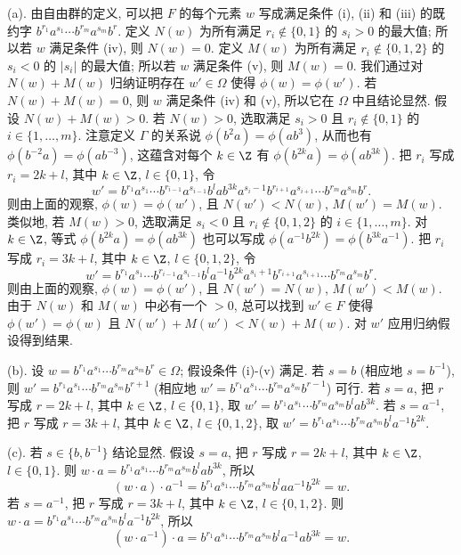 \begin{solution}
(a). 由自由群的定义, 可以把 $F$ 的每个元素 $w$ 写成满足条件 (i), (ii) 和 (iii) 的既约字 $b^{r_1}a^{s_1}\cdots b^{r_m}a^{s_m}b^r$. 定义 $N(w)$ 为所有满足 $r_i \notin \{0, 1\}$ 的 $s_i > 0$ 的最大值; 所以若 $w$ 满足条件 (iv), 则 $N(w) = 0$. 定义 $M(w)$ 为所有满足 $r_i \notin \{0, 1, 2\}$ 的 $s_i < 0$ 的 $|s_i|$ 的最大值; 所以若 $w$ 满足条件 (v), 则 $M(w) = 0$. 我们通过对 $N(w) + M(w)$ 归纳证明存在 $w' \in \Omega$ 使得 $\phi(w) = \phi(w')$. 若 $N(w) + M(w) = 0$, 则 $w$ 满足条件 (iv) 和 (v), 所以它在 $\Omega$ 中且结论显然.
假设 $N(w) + M(w) > 0$. 若 $N(w) > 0$, 选取满足 $s_i > 0$ 且 $r_i \notin \{0, 1\}$ 的 $i \in \{1, \ldots, m\}$. 注意定义 $\Gamma$ 的关系说 $\phi(b^2a) = \phi(ab^3)$, 从而也有 $\phi(b^{-2}a) = \phi(ab^{-3})$, 这蕴含对每个 $k \in \Z$ 有 $\phi(b^{2k}a) = \phi(ab^{3k})$. 把 $r_i$ 写成 $r_i = 2k + l$, 其中 $k \in \Z$, $l \in \{0, 1\}$, 令
\[
w' = b^{r_1}a^{s_1}\cdots b^{r_{i-1}}a^{s_{i-1}}b^la b^{3k}a^{s_i-1}b^{r_{i+1}}a^{s_{i+1}}\cdots b^{r_m}a^{s_m}b^r.
\]
则由上面的观察, $\phi(w) = \phi(w')$, 且 $N(w') < N(w)$, $M(w') = M(w)$.
类似地, 若 $M(w) > 0$, 选取满足 $s_i < 0$ 且 $r_i \notin \{0, 1, 2\}$ 的 $i \in \{1, \ldots, m\}$. 对 $k \in \Z$, 等式 $\phi(b^{2k}a) = \phi(ab^{3k})$ 也可以写成 $\phi(a^{-1}b^{2k}) = \phi(b^{3k}a^{-1})$. 把 $r_i$ 写成 $r_i = 3k + l$, 其中 $k \in \Z$, $l \in \{0, 1, 2\}$, 令
\[
w' = b^{r_1}a^{s_1}\cdots b^{r_{i-1}}a^{s_{i-1}}b^la^{-1}b^{2k}a^{s_i+1}b^{r_{i+1}}a^{s_{i+1}}\cdots b^{r_m}a^{s_m}b^r.
\]
则由上面的观察, $\phi(w) = \phi(w')$, 且 $N(w') = N(w)$, $M(w') < M(w)$. 由于 $N(w)$ 和 $M(w)$ 中必有一个 $> 0$, 总可以找到 $w' \in F$ 使得 $\phi(w') = \phi(w)$ 且 $N(w') + M(w') < N(w) + M(w)$. 对 $w'$ 应用归纳假设得到结果.

(b). 设 $w = b^{r_1}a^{s_1}\cdots b^{r_m}a^{s_m}b^r \in \Omega$; 假设条件 (i)-(v) 满足. 若 $s = b$ (相应地 $s = b^{-1}$), 则 $w' = b^{r_1}a^{s_1}\cdots b^{r_m}a^{s_m}b^{r+1}$ (相应地 $w' = b^{r_1}a^{s_1}\cdots b^{r_m}a^{s_m}b^{r-1}$) 可行. 若 $s = a$, 把 $r$ 写成 $r = 2k + l$, 其中 $k \in \Z$, $l \in \{0, 1\}$, 取 $w' = b^{r_1}a^{s_1}\cdots b^{r_m}a^{s_m}b^lab^{3k}$. 若 $s = a^{-1}$, 把 $r$ 写成 $r = 3k + l$, 其中 $k \in \Z$, $l \in \{0, 1, 2\}$, 取 $w' = b^{r_1}a^{s_1}\cdots b^{r_m}a^{s_m}b^la^{-1}b^{2k}$.

(c). 若 $s \in \{b, b^{-1}\}$ 结论显然. 假设 $s = a$, 把 $r$ 写成 $r = 2k + l$, 其中 $k \in \Z$, $l \in \{0, 1\}$. 则 $w \cdot a = b^{r_1}a^{s_1}\cdots b^{r_m}a^{s_m}b^lab^{3k}$, 所以
\[
(w \cdot a) \cdot a^{-1} = b^{r_1}a^{s_1}\cdots b^{r_m}a^{s_m}b^laa^{-1}b^{2k} = w.
\]
若 $s = a^{-1}$, 把 $r$ 写成 $r = 3k + l$, 其中 $k \in \Z$, $l \in \{0, 1, 2\}$. 则 $w \cdot a = b^{r_1}a^{s_1}\cdots b^{r_m}a^{s_m}b^la^{-1}b^{2k}$, 所以
\[
(w \cdot a^{-1}) \cdot a = b^{r_1}a^{s_1}\cdots b^{r_m}a^{s_m}b^la^{-1}ab^{3k} = w.
\]


\end{solution}
